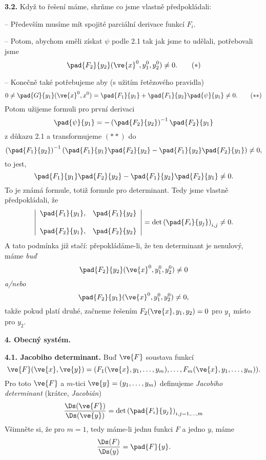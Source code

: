 \documentclass[12pt]{article}
\begin{document}
{\bigskip

{\bf 3.2.} Když to řešení máme, shrňme co jsme vlastně předpokládali:

-- Především musíme mít spojité
parciální derivace funkcí $F_i$.

-- Potom, abychom směli získat
$\psi$ podle 2.1 tak jak jsme to udělali, potřebovali jsme
\begin{equation}
\pad{F_2}{y_2}(\ve{x}^0,y^0_1,y^0_2)\neq 0. \tag{$*$}
\end{equation}

-- Konečně také potřebujeme aby (s užitím řetězového pravidla)
\begin{equation}
0\neq\displaystyle\pad{G}{y_1}(\ve{x}^0,x^0)=
\pad{F_1}{y_1}+\pad{F_1}{y_2}\pad{\psi}{y_1}\neq 0. \tag{$**$}
\end{equation}
Potom užijeme formuli pro první derivaci
$$
\pad{\psi}{y_1}=-\left(\pad{F_2}{y_2}\right)^{-1}\pad{F_2}{y_1}
$$
z důkazu 2.1 a transformujeme $(**)$ do
$$
\left(\pad{F_1}{y_2}\right)^{-1}\left(\pad{F_1}{y_1}\pad{F_2}{y_2}-\pad{F_1}{y_2}\pad{F_2}{y_1}\right)\neq 0,
$$
to jest,
$$
\pad{F_1}{y_1}\pad{F_2}{y_2}-\pad{F_1}{y_2}\pad{F_2}{y_1}\neq 0.
$$
To je známá formule, totiž formule pro determinant. Tedy jsme vlastně předpokládali, že
$$
\left|\begin{array}{cc}
\displaystyle\pad{F_1}{y_1},&\displaystyle\pad{F_1}{y_2}\\[3ex]
\displaystyle\pad{F_2}{y_1},&\displaystyle\pad{F_2}{y_2}
\end{array}\right|
=\text{det}\left(\pad{F_i}{y_j}\right)_{i,j}\neq 0. 
$$
A tato podmínka již stačí:
 přepokládáme-li, že ten determinant je nenulový, máme  {\em buď}
$$\pad{F_2}{y_2}(\ve{x}^0,y^0_1,y^0_2)\neq 0$$ 
{\em a/nebo}
$$\pad{F_2}{y_1}(\ve{x}^0,y^0_1,y^0_2)\neq 0,$$ 
takže pokud platí druhé, začneme řešením 
$F_2(\ve{x},y_1,y_2)=0$ pro $y_1$ místo pro $y_2$. 

\vskip10mm
 
  
 {\large\bf 4. Obecný systém.}
 
 \bigskip

{\bf 4.1. Jacobiho determinant.}  Buď $\ve{F}$ soustava funkcí
$$
\ve{F}(\ve{x},\ve{y})=(F_1(\ve{x},y_1,\dots,y_m),\dots,F_m(\ve{x},y_1,\dots,y_m)).
$$
Pro toto $\ve{F}$ a $m$-tici $\ve{y}=(y_1,\dots,y_m)$
definujeme {\em Jacobiho determinant} (krátce, {\em Jacobián})
$$
\frac{\Ds(\ve{F})}{\Ds(\ve{y})}=\text{det}\left(\pad{F_i}{y_j}\right)_{i,j=1,\dots,m}
$$
Všimněte si, že pro $m=1$, tedy máme-li jednu  funkci $F$ a jedno $y$,
máme
$$
\frac{\Ds(F)}{\Ds(y)}=\pad{F}{y}.
$$


}
\end{document}
